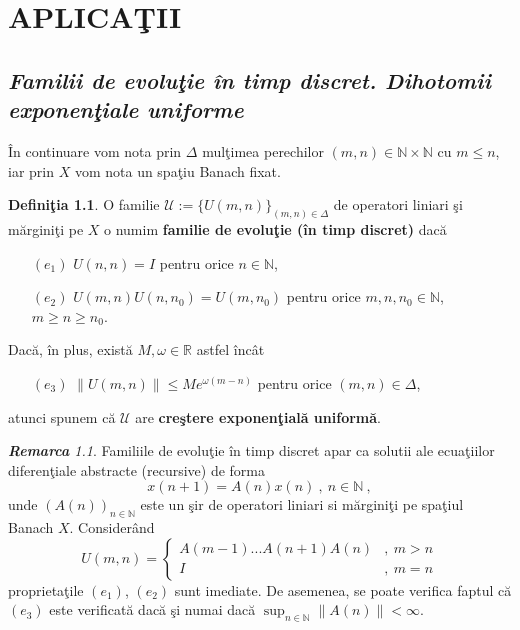 \documentclass[ a4paper, 12pt]{report}
\newcommand{\R}{\mathbb{R}}
\newcommand{\N}{\mathbb{N}}
\newcommand{\defnemph}[1]{\textbf{#1}}
\theoremstyle{definition}
\newtheorem{definition}{\bf Defini\c tia}[section]
\theoremstyle{remark}
\newtheorem{remarc}{\bf Remarca}[section]
\numberwithin{equation}{section}
\begin{document}
\chapter{APLICA\c TII}
\section{\textit{Familii de evolu\c tie \^in timp discret. Dihotomii exponen\c tiale uniforme}}


\^In continuare vom nota prin $\Delta$ mul\c timea perechilor $(m, n) \in \mathbb{N}\times \mathbb{N}$ cu $m \leq n$, iar prin $X$ vom nota un spa\c tiu Banach fixat.

\begin{definition}
O familie $\mathcal{U}:=\{U(m,n)\}_{(m,n)\in\Delta}$ de operatori liniari \c si m\u argini\c ti  pe $X$ o numim
\defnemph{familie de evolu\c tie (\^in timp discret)} dac\u a
\begin{enumerate}
\item[$(e_1)$] $U(n,n)=I$ pentru orice $n\in\N$,
\item[$(e_2)$] $U(m,n)U(n,n_0)=U(m,n_0)$ pentru orice $m, n, n_0\in\N$, $m\geq n\geq n_0$.
\end{enumerate}
Dac\u a, \^in plus, exist\u a $M,\omega\in\R$ astfel \^inc\^at
\begin{enumerate}
\item[$(e_3)$] $\|U(m,n)\|\leq Me^{\omega(m-n)}$ pentru orice $(m,n)\in\Delta$,
\end{enumerate}
atunci spunem c\u a $\mathcal{U}$ are \defnemph{cre\c stere exponen\c tial\u a uniform\u a}.
\end{definition}

\begin{remarc}
Familiile de evolu\c tie \^in timp discret apar ca solutii ale ecua\c tiilor diferen\c tiale abstracte (recursive) de forma
\begin{equation}
\label{differenceeq}
x(n+1) = A(n) x(n)\ ,\ n\in\N\ ,
\end{equation}
unde $(A(n))_{n\in\N}$ este un \c sir de operatori liniari si m\u argini\c ti pe spa\c tiul Banach $X$.
Consider\^and
$$U(m,n)=
\begin{cases}
A(m-1)...A(n+1)A(n) &,\ m>n\\
I &,\ m=n
\end{cases}
 $$
proprieta\c tile $(e_1)$, $(e_2)$ sunt imediate.
De asemenea, se poate verifica faptul c\u a $(e_3)$ este verificat\u a dac\u a \c si numai dac\u a
$\sup_{n\in\N}\|A(n)\| <\infty$.
\end{remarc}
\end{document}
